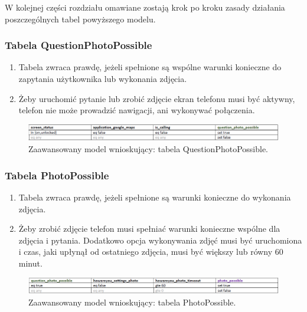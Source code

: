W kolejnej części rozdziału omawiane zostają krok po kroku zasady działania poszczególnych tabel powyższego modelu.


\subsubsection{Tabela QuestionPhotoPossible}

\begin{enumerate}
	\item Tabela zwraca prawdę, jeżeli spełnione są wspólne warunki konieczne do zapytania użytkownika lub wykonania zdjęcia.
	\item Żeby uruchomić pytanie lub zrobić zdjęcie ekran telefonu musi być aktywny, telefon nie może prowadzić nawigacji, ani wykonywać połączenia.
\end{enumerate}

\begin{figure}[H]
	\centering
	\includegraphics[scale=0.8]{rozdzial4/HMR_QuestionPhotoPossible.png}
	\caption{Zaawansowany model wnioskujący: tabela QuestionPhotoPossible.}
\end{figure}


\subsubsection{Tabela PhotoPossible}

\begin{enumerate}
\item Tabela zwraca prawdę, jeżeli spełnione są warunki konieczne do wykonania zdjęcia.
\item Żeby zrobić zdjęcie telefon musi spełniać warunki konieczne wspólne dla zdjęcia i pytania. Dodatkowo opcja wykonywania zdjęć musi być uruchomiona i czas, jaki upłynął od ostatniego zdjęcia, musi być większy lub równy 60 minut.

\end{enumerate}

\begin{figure}[H]
\centering
\includegraphics[scale=0.8]{rozdzial4/HMR_PhotoPossible.png}
\caption{Zaawansowany model wnioskujący: tabela PhotoPossible.}
\end{figure}


